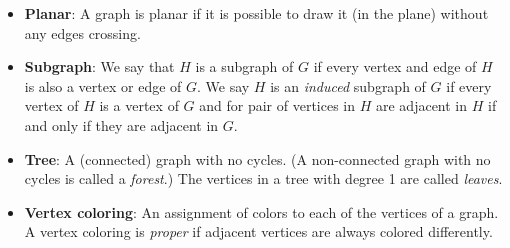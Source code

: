 \documentclass[11pt]{exam}
\def\r{2.5pt}
\def\v{circle (\r)}
\begin{document}
\begin{itemize}
    \item[] {\bf Planar}: A graph is planar if it is possible to draw it (in the plane) without any edges crossing.
    \item[] {\bf Subgraph}: We say that $H$ is a subgraph of $G$ if every vertex and edge of $H$ is also a vertex or edge of $G$.  We say $H$ is an {\em induced} subgraph of $G$ if every vertex of $H$ is a vertex of $G$ and for pair of vertices in $H$ are adjacent in $H$ if and only if they are adjacent in $G$.
    \item[] {\bf Tree}: A (connected) graph with no cycles.  (A non-connected graph with no cycles is called a {\em forest}.)  The vertices in a tree with degree 1 are called {\em leaves}.
    \item[] {\bf Vertex coloring}: An assignment of colors to each of the vertices of a graph. A vertex coloring is {\em proper} if adjacent vertices are always colored differently.

    
  \end{itemize}


%
%  
\end{document}
